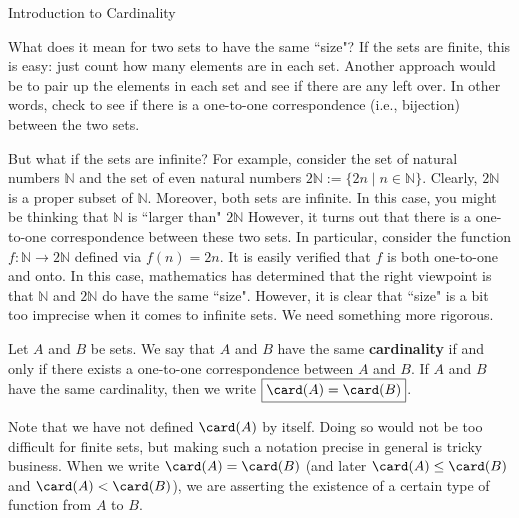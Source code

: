 \begin{section}{Introduction to Cardinality}

What does it mean for two sets to have the same ``size"?  If the sets are finite, this is easy: just count how many elements are in each set.  Another approach would be to pair up the elements in each set and see if there are any left over.  In other words, check to see if there is a one-to-one correspondence (i.e., bijection) between the two sets.  

But what if the sets are infinite?  For example, consider the set of natural numbers $\mathbb{N}$ and the set of even natural numbers $2\mathbb{N}:=\{2n\mid n\in \mathbb{N}\}$. Clearly, $2\mathbb{N}$ is a proper subset of $\mathbb{N}$.  Moreover, both sets are infinite.  In this case, you might be thinking that $\mathbb{N}$ is ``larger than" $2\mathbb{N}$  However, it turns out that there is a one-to-one correspondence between these two sets.  In particular, consider the function $f:\mathbb{N}\to 2\mathbb{N}$ defined via $f(n)=2n$.  It is easily verified that $f$ is both one-to-one and onto.  In this case, mathematics has determined that the right viewpoint is that $\mathbb{N}$ and $2\mathbb{N}$ do have the same ``size". However, it is clear that ``size" is a bit too imprecise when it comes to infinite sets. We need something more rigorous.

\begin{definition}
Let $A$ and $B$ be sets. We say that $A$ and $B$ have the same \textbf{cardinality} if and only if there exists a one-to-one correspondence between $A$ and $B$. If $A$ and $B$ have the same cardinality, then we write $\boxed{\card(A)=\card(B)}$.
\end{definition}

Note that we have not defined $\card(A)$ by itself. Doing so would not be too difficult for finite sets, but making such a notation precise in general is tricky business.  When we write $\card(A)=\card(B)$ (and later $\card(A)\leq \card(B)$ and $\card(A)<\card(B)$), we are asserting the existence of a certain type of function from $A$ to $B$.


\end{section}

